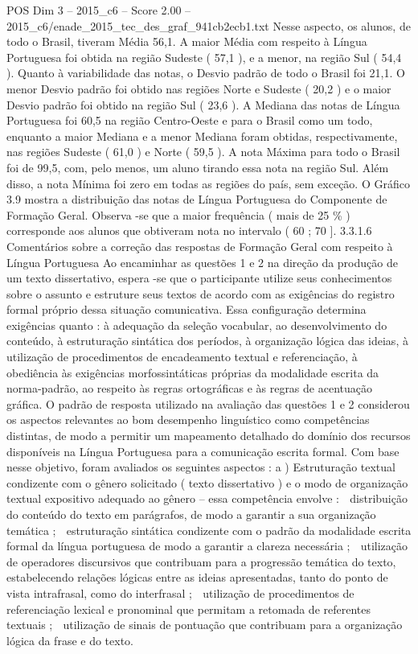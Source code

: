 \begin{textsample}{POS Dim 3 – 2015\_c6 – Score 2.00 – 2015\_c6/enade\_2015\_tec\_des\_graf\_941cb2ecb1.txt}
Nesse aspecto, os alunos, de todo o Brasil, tiveram Média 56,1.
A maior Média com respeito à Língua Portuguesa foi obtida na região Sudeste ( 57,1 ), e a menor, na região Sul ( 54,4 ).
Quanto à variabilidade das notas, o Desvio padrão de todo o Brasil foi 21,1.
O menor Desvio padrão foi obtido nas regiões Norte e Sudeste ( 20,2 ) e o maior Desvio padrão foi obtido na região Sul ( 23,6 ).
A Mediana das notas de Língua Portuguesa foi 60,5 na região Centro-Oeste e para o Brasil como um todo, enquanto a maior Mediana e a menor Mediana foram obtidas, respectivamente, nas regiões Sudeste ( 61,0 ) e Norte ( 59,5 ).
A nota Máxima para todo o Brasil foi de 99,5, com, pelo menos, um aluno tirando essa nota na região Sul.
Além disso, a nota Mínima foi zero em todas as regiões do país, sem exceção.
O Gráfico 3.9 mostra a distribuição das notas de Língua Portuguesa do Componente de Formação Geral.
Observa -se que a maior frequência ( mais de 25 \% ) corresponde aos alunos que obtiveram nota no intervalo ( 60 ; 70 ]. 3.3.1.6 Comentários sobre a correção das respostas de Formação Geral com respeito à Língua Portuguesa Ao encaminhar as questões 1 e 2 na direção da produção de um texto dissertativo, espera -se que o participante utilize seus conhecimentos sobre o assunto e estruture seus textos de acordo com as exigências do registro formal próprio dessa situação comunicativa.
Essa configuração determina exigências quanto : à adequação da seleção vocabular, ao desenvolvimento do conteúdo, à estruturação sintática dos períodos, à organização lógica das ideias, à utilização de procedimentos de encadeamento textual e referenciação, à obediência às exigências morfossintáticas próprias da modalidade escrita da norma-padrão, ao respeito às regras ortográficas e às regras de acentuação gráfica.
O padrão de resposta utilizado na avaliação das questões 1 e 2 considerou os aspectos relevantes ao bom desempenho linguístico como competências distintas, de modo a permitir um mapeamento detalhado do domínio dos recursos disponíveis na Língua Portuguesa para a comunicação escrita formal.
Com base nesse objetivo, foram avaliados os seguintes aspectos : a ) Estruturação textual condizente com o gênero solicitado ( texto dissertativo ) e o modo de organização textual expositivo adequado ao gênero – essa competência envolve :  distribuição do conteúdo do texto em parágrafos, de modo a garantir a sua organização temática ;  estruturação sintática condizente com o padrão da modalidade escrita formal da língua portuguesa de modo a garantir a clareza necessária ;  utilização de operadores discursivos que contribuam para a progressão temática do texto, estabelecendo relações lógicas entre as ideias apresentadas, tanto do ponto de vista intrafrasal, como do interfrasal ;  utilização de procedimentos de referenciação lexical e pronominal que permitam a retomada de referentes textuais ;  utilização de sinais de pontuação que contribuam para a organização lógica da frase e do texto.

\end{textsample}
